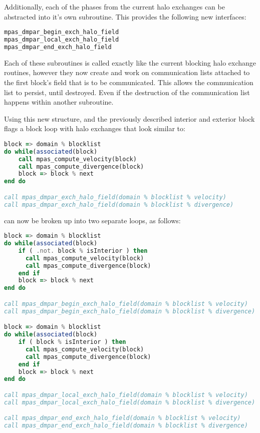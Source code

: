 \documentclass[11pt]{report}
\begin{document}
Additionally, each of the phases from the current halo exchanges can be
abstracted into it's own subroutine. This provides the following new
interfaces:

{\small
\begin{lstlisting}[language=fortran,escapechar=@,frame=single]
mpas_dmpar_begin_exch_halo_field
mpas_dmpar_local_exch_halo_field
mpas_dmpar_end_exch_halo_field
\end{lstlisting}
}

Each of these subroutines is called exactly like the current blocking halo
exchange routines, however they now create and work on communication lists
attached to the first block's field that is to be communicated. This allows the
communication list to persist, until destroyed. Even if the destruction of the
communication list happens within another subroutine.

Using this new structure, and the previously described interior and exterior
block flags a block loop with halo exchanges that look similar to:

{\tiny
\begin{lstlisting}[language=fortran,escapechar=@,frame=single]
block => domain % blocklist
do while(associated(block)
	call mpas_compute_velocity(block)
	call mpas_compute_divergence(block)
	block => block % next
end do

call mpas_dmpar_exch_halo_field(domain % blocklist % velocity)
call mpas_dmpar_exch_halo_field(domain % blocklist % divergence)
\end{lstlisting}
}

\pagebreak
can now be broken up into two separate loops, as follows:


{\tiny
\begin{lstlisting}[language=fortran,escapechar=@,frame=single]
block => domain % blocklist
do while(associated(block)
	if ( .not. block % isInterior ) then
	  call mpas_compute_velocity(block)
	  call mpas_compute_divergence(block)
	end if
	block => block % next
end do

call mpas_dmpar_begin_exch_halo_field(domain % blocklist % velocity)
call mpas_dmpar_begin_exch_halo_field(domain % blocklist % divergence)

block => domain % blocklist
do while(associated(block)
	if ( block % isInterior ) then
	  call mpas_compute_velocity(block)
	  call mpas_compute_divergence(block)
	end if
	block => block % next
end do

call mpas_dmpar_local_exch_halo_field(domain % blocklist % velocity)
call mpas_dmpar_local_exch_halo_field(domain % blocklist % divergence)

call mpas_dmpar_end_exch_halo_field(domain % blocklist % velocity)
call mpas_dmpar_end_exch_halo_field(domain % blocklist % divergence)
\end{lstlisting}
}
\end{document}
